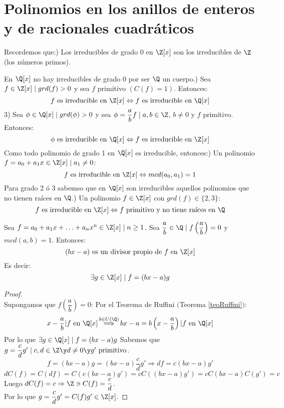 \newpage
\section{Polinomios en los anillos de enteros y de racionales cuadráticos}
Recordemos que:) Los irreducibles de grado 0 en $\Z[x]$ son los irreducibles de $\Z$ (los números primos).\par
En $\Q[x]$ no hay irreducibles de grado 0 por ser $\Q$ un cuerpo.) Sea $f \in \Z[x] \mid grd(f)>0$ y sea $f$ primitivo $(C(f)=1)$. Entonces:
$$f \mbox{ es irreducible en } \Z[x] \Leftrightarrow f \mbox{ es irreducible en } \Q[x]$$
3) Sea $\phi \in \Q[x] \mid grd(\phi)>0$ y sea $\phi=\dfrac{a}{b}f \mid a,b \in \Z$, $b \neq 0$ y $f$ primitivo. Entonces:
$$\phi \mbox{ es irreducible en } \Q[x] \Leftrightarrow f \mbox{ es irreducible en } \Z[x]$$
Como todo polinomio de grado 1 en $\Q[x]$ es irreducible, entonces:) Un polinomio $f=a_0+a_1x \in \Z[x] \mid a_1 \neq 0$:
$$f \mbox{ es irreducible en } \Z[x] \Leftrightarrow mcd(a_0,a_1)=1$$
Para grado 2 ó 3 sabemso que en $\Q[x]$ son irreducibles aquellos polinomios que no tienen raíces en $\Q$.) Un polinomio $f \in \Z[x]$ con $grd(f) \in \{2,3\}$:
$$f \mbox{ es irreducible en } \Z[x] \Leftrightarrow f \mbox{ primitivo y no tiene raíces en } \Q$$

\begin{prop}
    \label{propbxmenosA}
    Sea $f=a_0+a_1x+\ldots+a_nx^n \in \Z[x] \mid n\geq 1$. \newline Sea $\dfrac{a}{b} \in \Q \mid f\left(\dfrac{a}{b}\right)=0$
    y $mcd(a,b)=1$. Entonces:
    $$(bx-a) \mbox{ es un divisor propio de } f \mbox{ en } \Z[x]$$
    Es decir:
    $$\exists g \in \Z[x] \mid f=(bx-a)g$$
\begin{proof}
    \ \\
    Supongamos que $f\left(\dfrac{a}{b}\right) = 0$:\newline
    Por el Teorema de Ruffini $($Teorema \ref{teoRuffini}$)$:
    $$x-\dfrac{a}{b}|f \mbox{ en } \Q[x] \mathop{\Longrightarrow}^{b \in U(\Q)} bx-a=b\left(x-\dfrac{a}{b}\right)|f \mbox{ en } \Q[x]$$
    Por lo que $\exists g \in \Q[x] \mid f=(bx-a)g$\newline
    Sabemos que $g=\dfrac{c}{d}g' \mid c,d \in \Z \y d \neq 0 \y g' \mbox{ primitivo}$.
    $$f=(bx-a)g=(bx-a)\dfrac{c}{d}g' \Rightarrow df=c(bx-a)g'$$
    $$dC(f) = C(df) = C(c(bx-a)g')=cC((bx-a)g')=cC(bx-a)C(g')=c$$
    Luego $dC(f)=c \Rightarrow \Z \ni C(f) = \dfrac{c}{d}$.\\

    
    Por lo que $g=\dfrac{c}{d}g' = C(f)g' \in \Z[x]$.
\end{proof}
\end{prop}

